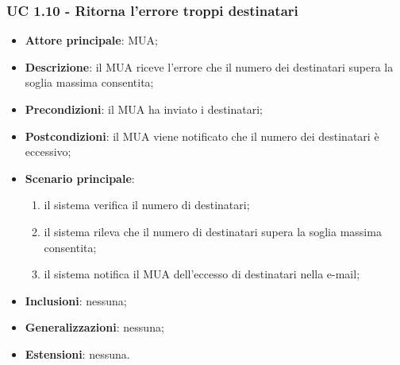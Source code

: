     \subsubsection{UC 1.10 - Ritorna l'errore troppi destinatari} \label{sec:UC1.10}
    \begin{itemize}
        \item \textbf{Attore principale}: MUA;
        \item \textbf{Descrizione}: il MUA riceve l'errore che il numero dei destinatari supera la soglia massima consentita;
        \item \textbf{Precondizioni}: il MUA ha inviato i destinatari;
        \item \textbf{Postcondizioni}: il MUA viene notificato che il numero dei destinatari è eccessivo;
        \item \textbf{Scenario principale}:
            \begin{enumerate}
                \item il sistema verifica il numero di destinatari;
                \item il sistema rileva che il numero di destinatari supera la soglia massima consentita;
                \item il sistema notifica il MUA dell'eccesso di destinatari nella e-mail;
            \end{enumerate}
        \item \textbf{Inclusioni}: nessuna;
        \item \textbf{Generalizzazioni}: nessuna;
        \item \textbf{Estensioni}: nessuna.
    \end{itemize}



